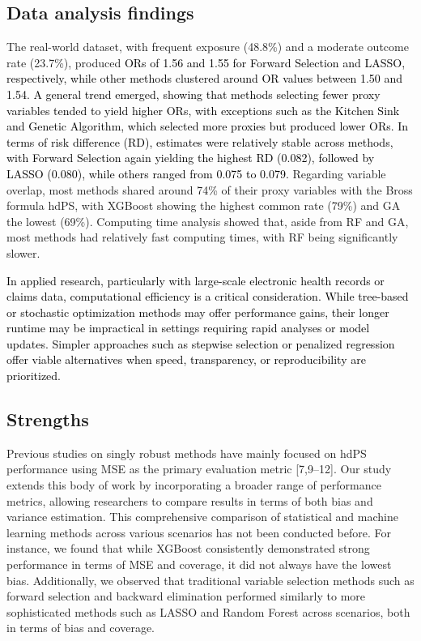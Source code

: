 \documentclass[10pt,letterpaper]{article}
\begin{document}
\subsection{Data analysis findings}\label{data-analysis-findings}

The real-world dataset, with frequent exposure (48.8\%) and a moderate
outcome rate (23.7\%), produced
\textcolor{black}{ORs of 1.56 and 1.55 for Forward Selection and LASSO, respectively, while other methods clustered around OR values between 1.50 and 1.54. A general trend emerged, showing that methods selecting fewer proxy variables tended to yield higher ORs, with exceptions such as the Kitchen Sink and Genetic Algorithm, which selected more proxies but produced lower ORs. In terms of risk difference (RD), estimates were relatively stable across methods, with Forward Selection again yielding the highest RD (0.082), followed by LASSO (0.080), while others ranged from 0.075 to 0.079.}
Regarding variable overlap, most methods shared around 74\% of their
proxy variables with the Bross formula hdPS, with XGBoost showing the
highest common rate (79\%) and GA the lowest (69\%). Computing time
analysis showed that, aside from RF and GA, most methods had relatively
fast computing times, with RF being significantly slower.

\textcolor{black}{In applied research, particularly with large-scale electronic health records or claims data, computational efficiency is a critical consideration. While tree-based or stochastic optimization methods may offer performance gains, their longer runtime may be impractical in settings requiring rapid analyses or model updates. Simpler approaches such as stepwise selection or penalized regression offer viable alternatives when speed, transparency, or reproducibility are prioritized.}

\subsection{Strengths}\label{strengths}

Previous studies on singly robust methods have mainly focused on hdPS
performance using MSE as the primary evaluation metric {[}7,9--12{]}.
Our study extends this body of work by incorporating a broader range of
performance metrics, allowing researchers to compare results in terms of
both bias and variance estimation. This comprehensive comparison of
statistical and machine learning methods across various scenarios has
not been conducted before. For instance, we found that while XGBoost
consistently demonstrated strong performance in terms of MSE and
coverage, it did not always have the lowest bias. Additionally, we
observed that traditional variable selection methods such as forward
selection and backward elimination performed similarly to more
sophisticated methods such as LASSO and Random Forest across scenarios,
both in terms of bias and coverage.
\end{document}
